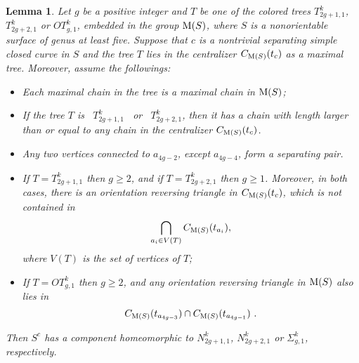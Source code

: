 \documentclass[11 pt]{amsart}
\newtheorem{Lemma}[Theorem]{Lemma}
\theoremstyle{definition}
\begin{document}
\begin{Lemma}\label{LemChr-2.2} Let $g$ be a positive integer and
$T$ be one of the colored trees $T_{2g+1,1}^k$, $T_{2g+2,1}^k$ or
$OT_{g,1}^k$, embedded in the group ${\rm M}(S)$, where $S$ is a
nonorientable surface of genus at least five. Suppose that $c$ is a
nontrivial separating simple closed curve in $S$ and the tree $T$
lies in the centralizer $C_{{\rm M}(S)}(t_c)$ as a maximal tree.
Moreover, assume the followings:

\begin{itemize}
\item[1)] Each maximal chain in the tree is a maximal chain in ${\rm M}(S)$;

\item[2)] If the tree $T$ is \ $T_{2g+1,1}^k$ \ or \ $T_{2g+2,1}^k$, then it
has a chain with length larger than or equal to any chain in the
centralizer $C_{{\rm M}(S)}(t_c)$.

\item[3)] Any two vertices connected to $a_{4g-2}$, except $a_{4g-4}$, form a
separating pair.

\item[4a)] If $T=T_{2g+1,1}^k$ then $g\geq 2$, and if $T=T_{2g+2,1}^k$ then
$g\geq 1$. Moreover, in both cases, there is an orientation
reversing triangle in $C_{{\rm M}(S)}(t_c)$, which is not contained
in $$\bigcap_{a_i\in V(T)}C_{{\rm M}(S)}(t_{a_i}),$$ where $V(T)$ is
the set of vertices of $T$;

\item[4b)] If $T=OT_{g,1}^k$ then $g\geq 2$, and any orientation reversing
triangle in ${\rm M}(S)$ also lies in
$$C_{{\rm M}(S)}(t_{a_{4g-3}})\cap C_{{\rm M}(S)}(t_{a_{4g-1}}) \
.$$
\end{itemize}

\noindent Then $S^c$ has a component homeomorphic to $N_{2g+1,1}^k$,
$N_{2g+2,1}^k$ or $\Sigma_{g,1}^k$, respectively.
\end{Lemma}
\end{document}
